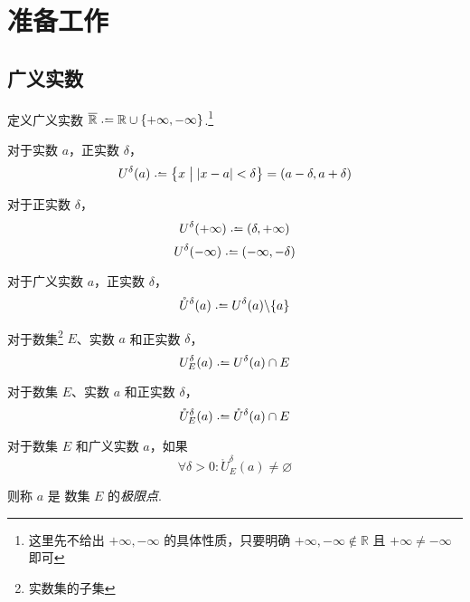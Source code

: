 \section{准备工作}
\subsection{广义实数}
\begin{definition}
    定义广义实数 $\overline{\mathbb{R}} \defeq \mathbb{R} \cup \{+\infty, -\infty\}$.\footnote{这里先不给出 $+\infty, -\infty$ 的具体性质，只要明确 $+\infty, -\infty \notin \mathbb{R}$ 且 $+\infty \neq -\infty$ 即可}
\end{definition}\vspace{9pt}

\begin{subdefinition}
    对于实数 $a$，正实数 $\delta$，
    \[U^\delta(a) \defeq \bigl\{x \bigm| \lvert x - a \rvert < \delta \bigr\} = (a-\delta, a+\delta)\]
\end{subdefinition}

\begin{subdefinition}
    对于正实数 $\delta$，
    \[U^\delta(+\infty) \defeq (\delta , +\infty)\]
    \[U^\delta(-\infty) \defeq (-\infty, -\delta)\]
\end{subdefinition}

\begin{subdefinition}
    对于广义实数 $a$，正实数 $\delta$，
    \[\mathring{U}^\delta(a) \defeq U^\delta(a) \backslash \{a\}\]
\end{subdefinition}

\begin{subdefinition}
    对于数集\footnote{实数集的子集} $E$、实数 $a$ 和正实数 $\delta$，
    \[U_E^\delta(a) \defeq U^\delta(a) \cap E\]
\end{subdefinition}

\begin{subdefinition}
    对于数集 $E$、实数 $a$ 和正实数 $\delta$，
    \[\mathring{U}_E^\delta(a) \defeq \mathring{U}^\delta(a) \cap E\]
\end{subdefinition}\vspace{9pt}

\begin{definition}
    对于数集 $E$ 和广义实数 $a$，如果
    \[\forall \delta > 0: \mathring{U}_E^\delta(a) \neq \varnothing\]

    则称 $a$ 是 数集 $E$ 的\emph{极限点}.
\end{definition}

